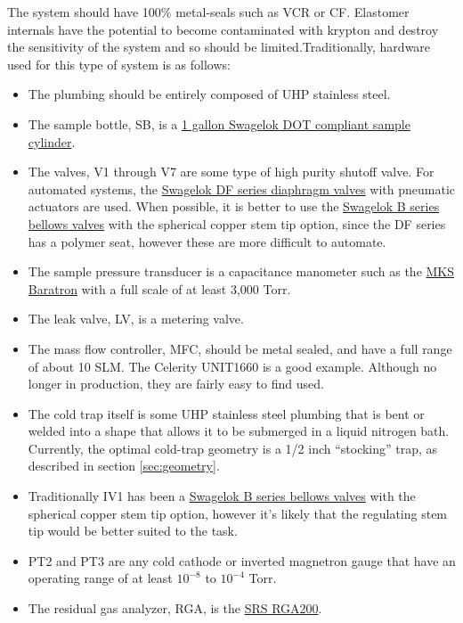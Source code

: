 The system should have 100\% metal-seals such as VCR or CF. Elastomer internals have the potential to become contaminated with krypton and destroy the sensitivity of the system and so should be limited.Traditionally, hardware used for this type of system is as follows:
\begin{itemize}
\item The plumbing should be entirely composed of UHP stainless steel.
\item The sample bottle, SB, is a \href{https://www.swagelok.com/en/product/Sample-Cylinders/DOT-Compliant}{1 gallon Swagelok DOT compliant sample cylinder}. 
\item The valves, V1 through V7 are some type of high purity shutoff valve. For automated systems, the \href{https://www.swagelok.com/en/product/Valves/Diaphragm-Sealed-Valves}{Swagelok DF series diaphragm valves} with pneumatic actuators are used. When possible, it is better to use the \href{https://www.swagelok.com/en/product/Valves/Bellows-Sealed}{Swagelok B series bellows valves} with the spherical copper stem tip option, since the DF series has a polymer seat, however these are more difficult to automate.
\item The sample pressure transducer is a capacitance manometer such as the \href{https://www.mksinst.com/product/category.aspx?CategoryID=72}{MKS Baratron} with a full scale of at least 3,000 Torr.
\item The leak valve, LV, is a metering valve.
\item The mass flow controller, MFC, should be metal sealed, and have a full range of about 10 SLM. The Celerity UNIT1660 is a good example. Although no longer in production, they are fairly easy to find used.
\item The cold trap itself is some UHP stainless steel plumbing that is bent or welded into a shape that allows it to be submerged in a liquid nitrogen bath. Currently, the optimal cold-trap geometry is a 1/2 inch ``stocking'' trap, as described in section \ref{sec:geometry}.
\item Traditionally IV1 has been a \href{https://www.swagelok.com/en/product/Valves/Bellows-Sealed}{Swagelok B series bellows valves} with the spherical copper stem tip option, however it's likely that the regulating stem tip would be better suited to the task. 
\item PT2 and PT3 are any cold cathode or inverted magnetron gauge that have an operating range of at least $10^{-8}$ to $10^{-4}$ Torr.
\item The residual gas analyzer, RGA, is the \href{http://www.thinksrs.com/products/RGA.htm}{SRS RGA200}.

\end{itemize}
